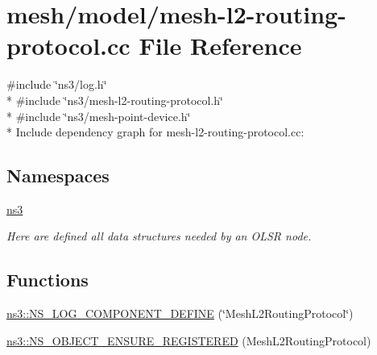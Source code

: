 \hypertarget{mesh-l2-routing-protocol_8cc}{}\section{mesh/model/mesh-\/l2-\/routing-\/protocol.cc File Reference}
\label{mesh-l2-routing-protocol_8cc}
{\ttfamily \#include \char`\"{}ns3/log.\+h\char`\"{}}\\*
{\ttfamily \#include \char`\"{}ns3/mesh-\/l2-\/routing-\/protocol.\+h\char`\"{}}\\*
{\ttfamily \#include \char`\"{}ns3/mesh-\/point-\/device.\+h\char`\"{}}\\*
Include dependency graph for mesh-\/l2-\/routing-\/protocol.cc\+:
\subsection*{Namespaces}
\begin{DoxyCompactItemize}
\item 
 \hyperlink{namespacens3}{ns3}
\begin{DoxyCompactList}\small\item\em Here are defined all data structures needed by an O\+L\+SR node. \end{DoxyCompactList}\end{DoxyCompactItemize}
\subsection*{Functions}
\begin{DoxyCompactItemize}
\item 
\hyperlink{namespacens3_a6116536bf0a1e65f6cdd3a1bad624499}{ns3\+::\+N\+S\+\_\+\+L\+O\+G\+\_\+\+C\+O\+M\+P\+O\+N\+E\+N\+T\+\_\+\+D\+E\+F\+I\+NE} (\char`\"{}Mesh\+L2\+Routing\+Protocol\char`\"{})
\item 
\hyperlink{namespacens3_a6114663ad459d33bdc11f0a0306e6931}{ns3\+::\+N\+S\+\_\+\+O\+B\+J\+E\+C\+T\+\_\+\+E\+N\+S\+U\+R\+E\+\_\+\+R\+E\+G\+I\+S\+T\+E\+R\+ED} (Mesh\+L2\+Routing\+Protocol)
\end{DoxyCompactItemize}
